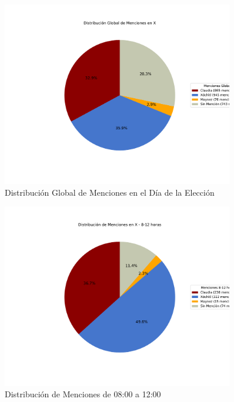 \documentclass[10pt, a4paper]{article}
\begin{document}
	\newpage
	\begin{figure}[h!]
		\centering
		\includegraphics[width=0.9\textwidth]{grafica_global_x.pdf} %
		\vspace{-15mm}
		\caption{Distribución Global de Menciones en el Día de la Elección}
		\label{fig:globalDiaEleccion} %
	\end{figure}
	
	
	
	\begin{figure}[h!]
		\centering
		\includegraphics[width=0.9\textwidth]{grafica_intervalo_8-12.pdf} %
		\vspace{-15mm}
		\caption{Distribución de Menciones de 08:00 a 12:00}
		\label{fig:xIntervalo812} %
	\end{figure}
	
\end{document}
